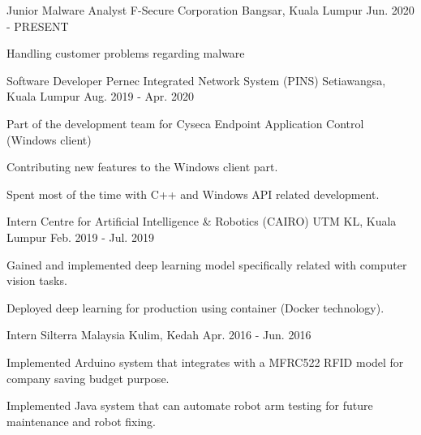 

\begin{cventries}


\cventry
  {Junior Malware Analyst}
  {F-Secure Corporation}
  {Bangsar, Kuala Lumpur}
  {Jun. 2020 - PRESENT}
  {
    \begin{cvitems}
      \item {Handling customer problems regarding malware}
    \end{cvitems}
  }

\cventry
  {Software Developer}
  {Pernec Integrated Network System (PINS)}
  {Setiawangsa, Kuala Lumpur}
  {Aug. 2019 - Apr. 2020}
  {
    \begin{cvitems}
      \item {Part of the development team for Cyseca Endpoint Application Control (Windows client)}
      \item {Contributing new features to the Windows client part.}
      \item {Spent most of the time with C++ and Windows API related development.}
    \end{cvitems}
  }

\cventry
  {Intern}
  {Centre for Artificial Intelligence \& Robotics (CAIRO)}
  {UTM KL, Kuala Lumpur}
  {Feb. 2019 - Jul. 2019}
  {
    \begin{cvitems}
      \item {Gained and implemented deep learning model specifically related with computer vision tasks.}
      \item {Deployed deep learning for production using container (Docker technology).}
    \end{cvitems}
  }

\cventry
  {Intern}
  {Silterra Malaysia}
  {Kulim, Kedah}
  {Apr. 2016 - Jun. 2016}
  {
    \begin{cvitems}
      \item {Implemented Arduino system that integrates with a MFRC522 RFID model for company saving budget purpose.}
      \item {Implemented Java system that can automate robot arm testing for future maintenance and robot fixing.}
    \end{cvitems}
  }

\end{cventries}

